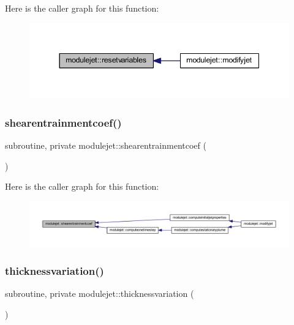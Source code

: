 Here is the caller graph for this function\+:\nopagebreak
\begin{figure}[H]
\begin{center}
\leavevmode
\includegraphics[width=344pt]{namespacemodulejet_ab0790a91803700e0bd5e3ef9db5242c1_icgraph}
\end{center}
\end{figure}
\mbox{\label{namespacemodulejet_afbaba1fae7aab0a9a372600923511fed}} 
\subsubsection{\texorpdfstring{shearentrainmentcoef()}{shearentrainmentcoef()}}
{\footnotesize\ttfamily subroutine, private modulejet\+::shearentrainmentcoef (\begin{DoxyParamCaption}{ }\end{DoxyParamCaption})\hspace{0.3cm}{\ttfamily [private]}}

Here is the caller graph for this function\+:\nopagebreak
\begin{figure}[H]
\begin{center}
\leavevmode
\includegraphics[width=350pt]{namespacemodulejet_afbaba1fae7aab0a9a372600923511fed_icgraph}
\end{center}
\end{figure}
\mbox{\label{namespacemodulejet_a5241bdca6d72d79d96fdc8d9b63a291a}} 
\subsubsection{\texorpdfstring{thicknessvariation()}{thicknessvariation()}}
{\footnotesize\ttfamily subroutine, private modulejet\+::thicknessvariation (\begin{DoxyParamCaption}{ }\end{DoxyParamCaption})\hspace{0.3cm}{\ttfamily [private]}}

